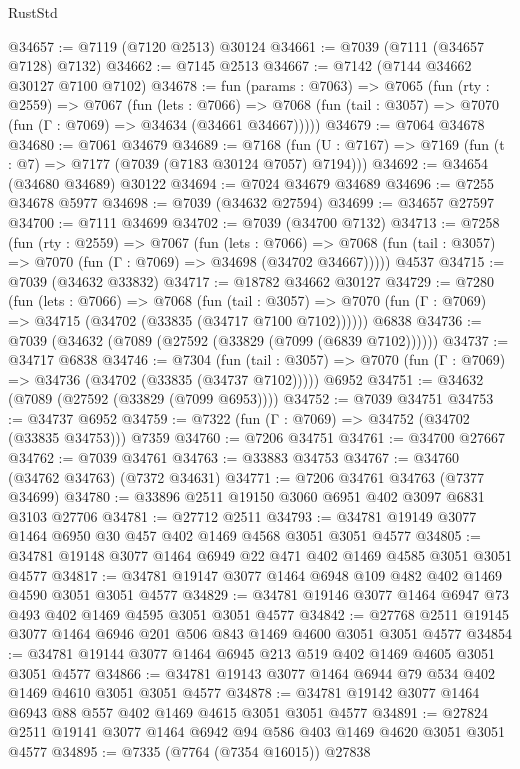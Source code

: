 \begin{lexlean}{RustStd}
\begin{coremodule}
@34657 := @7119 (@7120 @2513) @30124
@34661 := @7039 (@7111 (@34657 @7128) @7132)
@34662 := @7145 @2513
@34667 := @7142 (@7144 @34662 @30127 @7100 @7102)
@34678 := fun (params : @7063) =>
  @7065
    (fun (rty : @2559) =>
    @7067
      (fun (lets : @7066) =>
      @7068 (fun (tail : @3057) => @7070 (fun (Γ : @7069) => @34634 (@34661 @34667)))))
@34679 := @7064 @34678
@34680 := @7061 @34679
@34689 := @7168
    (fun (U : @7167) => @7169 (fun (t : @7) => @7177 (@7039 (@7183 @30124 @7057) @7194)))
@34692 := @34654 (@34680 @34689) @30122
@34694 := @7024 @34679 @34689
@34696 := @7255 @34678 @5977
@34698 := @7039 (@34632 @27594)
@34699 := @34657 @27597
@34700 := @7111 @34699
@34702 := @7039 (@34700 @7132)
@34713 := @7258
    (fun (rty : @2559) =>
    @7067
      (fun (lets : @7066) =>
      @7068 (fun (tail : @3057) => @7070 (fun (Γ : @7069) => @34698 (@34702 @34667)))))
    @4537
@34715 := @7039 (@34632 @33832)
@34717 := @18782 @34662 @30127
@34729 := @7280
    (fun (lets : @7066) =>
    @7068
      (fun (tail : @3057) =>
      @7070 (fun (Γ : @7069) => @34715 (@34702 (@33835 (@34717 @7100 @7102))))))
    @6838
@34736 := @7039 (@34632 (@7089 (@27592 (@33829 (@7099 (@6839 @7102))))))
@34737 := @34717 @6838
@34746 := @7304
    (fun (tail : @3057) => @7070 (fun (Γ : @7069) => @34736 (@34702 (@33835 (@34737 @7102)))))
    @6952
@34751 := @34632 (@7089 (@27592 (@33829 (@7099 @6953))))
@34752 := @7039 @34751
@34753 := @34737 @6952
@34759 := @7322 (fun (Γ : @7069) => @34752 (@34702 (@33835 @34753))) @7359
@34760 := @7206 @34751
@34761 := @34700 @27667
@34762 := @7039 @34761
@34763 := @33883 @34753
@34767 := @34760 (@34762 @34763) (@7372 @34631)
@34771 := @7206 @34761 @34763 (@7377 @34699)
@34780 := @33896 @2511 @19150 @3060 @6951 @402 @3097 @6831 @3103 @27706
@34781 := @27712 @2511
@34793 := @34781 @19149 @3077 @1464 @6950 @30 @457 @402 @1469 @4568 @3051 @3051 @4577
@34805 := @34781 @19148 @3077 @1464 @6949 @22 @471 @402 @1469 @4585 @3051 @3051 @4577
@34817 := @34781 @19147 @3077 @1464 @6948 @109 @482 @402 @1469 @4590 @3051 @3051 @4577
@34829 := @34781 @19146 @3077 @1464 @6947 @73 @493 @402 @1469 @4595 @3051 @3051 @4577
@34842 := @27768 @2511 @19145 @3077 @1464 @6946 @201 @506 @843 @1469 @4600 @3051 @3051 @4577
@34854 := @34781 @19144 @3077 @1464 @6945 @213 @519 @402 @1469 @4605 @3051 @3051 @4577
@34866 := @34781 @19143 @3077 @1464 @6944 @79 @534 @402 @1469 @4610 @3051 @3051 @4577
@34878 := @34781 @19142 @3077 @1464 @6943 @88 @557 @402 @1469 @4615 @3051 @3051 @4577
@34891 := @27824 @2511 @19141 @3077 @1464 @6942 @94 @586 @403 @1469 @4620 @3051 @3051 @4577
@34895 := @7335 (@7764 (@7354 @16015)) @27838

\end{coremodule}
\end{lexlean}

